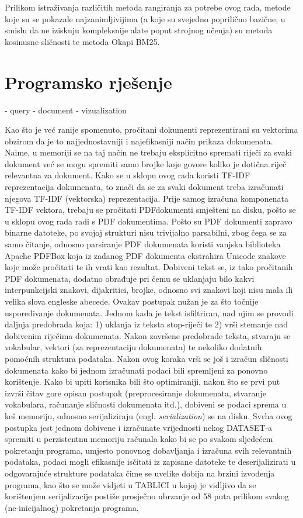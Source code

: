 \documentclass[times, utf8, zavrsni]{fer}
\begin{document}
Prilikom istraživanja različitih metoda rangiranja za potrebe ovog rada, metode koje su se pokazale najzanimljivijima (a koje su svejedno poprilično bazične, u smislu da ne iziskuju kompleksnije alate poput strojnog učenja) su metoda kosinusne sličnosti te metoda Okapi BM25.

\chapter{Programsko rješenje}
- query
- document
- vizualization

Kao što je već ranije spomenuto, pročitani dokumenti reprezentirani su vektorima obzirom da je to najjednostavniji i najefikasniji način prikaza dokumenata. Naime, u memoriji se na taj način ne trebaju eksplicitno spremati riječi za svaki dokument već se mogu spremiti samo brojke koje govore koliko je dotična riječ relevantna za dokument. Kako se u sklopu ovog rada koristi TF-IDF reprezentacija dokumenata, to znači da se za svaki dokument treba izračunati njegova TF-IDF (vektorska) reprezentacija. Prije samog izračuna komponenata TF-IDF vektora, trebaju se pročitati PDFdokumenti smješteni na disku, pošto se u sklopu ovog rada radi s PDF dokumentima. Pošto su PDF dokumenti zapravo binarne datoteke, po svojoj strukturi nisu trivijalno parsabilni, zbog čega se za samo čitanje, odnosno parsiranje PDF dokumenata koristi vanjska biblioteka Apache PDFBox koja iz zadanog PDF dokumenta ekstrahira Unicode znakove koje može pročitati te ih vrati kao rezultat. Dobiveni tekst se, iz tako pročitanih PDF dokumenata, dodatno obrađuje pri čemu se uklanjaju bilo kakvi interpunkcijski znakovi, dijakritici, brojke, odnosno svi znakovi koji nisu mala ili velika slova engleske abecede. Ovakav postupak nužan je za što točnije uspoređivanje dokumenata.
Jednom kada je tekst isfiltriran, nad njim se provodi daljnja predobrada koja: 1) uklanja iz teksta stop-riječi te 2) vrši stemanje nad dobivenim riječima dokumenata. Nakon završene predobrade teksta, stvaraju se vokabular, vektori (za reprezentaciju dokumenata) te nekoliko dodatnih pomoćnih struktura podataka. Nakon ovog koraka vrši se još i izračun sličnosti dokumenata kako bi jednom izračunati podaci bili spremljeni za ponovno korištenje. Kako bi upiti korisnika bili što optimiraniji, nakon što se prvi put izvrši čitav gore opisan postupak (preprocesiranje dokumenata, stvaranje vokabulara, računanje sličnosti dokumenata itd.), dobiveni se podaci sprema u keš memoriju, odnosno serijaliziraju (engl. \textit{serialization}) se na disku. Svrha ovog postupka jest jednom dobivene i izračunate vrijednosti nekog DATASET-a spremiti u perzistentnu memoriju računala kako bi se po svakom sljedećem pokretanju programa, umjesto ponovnog dobavljanja i izračuna svih relevantnih podataka, podaci mogli efikasnije isčitati iz zapisane datoteke te deserijalizirati u odgovarajuće strukture podataka čime se uvelike dobija na brzini izvođenja programa, kao što se može vidjeti u TABLICI u kojoj je vidljivo da se korištenjem serijalizacije postiže prosječno ubrzanje od 58 puta prilikom svakog (ne-inicijalnog) pokretanja programa.
\end{document}
